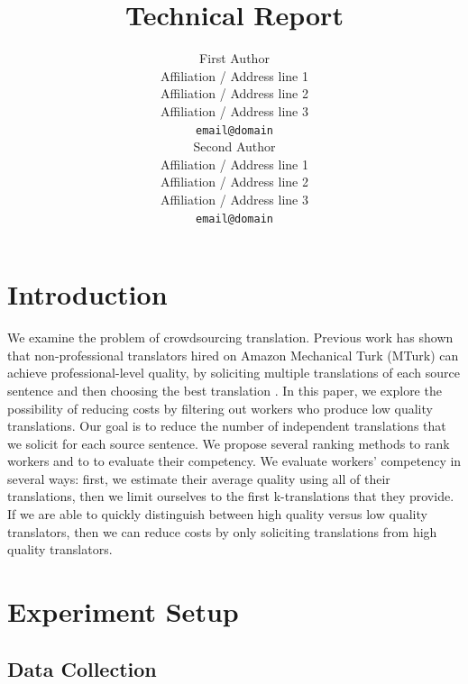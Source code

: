 \documentclass[11pt]{article}
\title{Technical Report}
\author{First Author \\
  Affiliation / Address line 1 \\
  Affiliation / Address line 2 \\
  Affiliation / Address line 3 \\
  {\tt email@domain} \\\And
  Second Author \\
  Affiliation / Address line 1 \\
  Affiliation / Address line 2 \\
  Affiliation / Address line 3 \\
  {\tt email@domain} \\}
\date{}
\begin{document}
\maketitle
\begin{abstract}
\end{abstract}

\section{Introduction}

We examine the problem of crowdsourcing translation. Previous work has shown that non-professional translators hired on Amazon Mechanical Turk (MTurk) can achieve professional-level quality, by soliciting multiple translations of each source sentence and then choosing the best translation \cite{zaidan-callisonburch:2011:ACL-HLT2011a}.
In this paper, we explore the possibility of  reducing costs by filtering out workers who produce low quality translations.  Our goal is to reduce the number of independent translations that we solicit for each source sentence. 
We propose several ranking methods to rank workers and to to evaluate their competency. 
We evaluate workers' competency in several ways: first, we estimate their average quality using all of their translations, then we limit ourselves to the first k-translations that they provide. If we are able to quickly distinguish between high quality versus low quality translators, then we can reduce costs by only soliciting translations from high quality translators.   



\section{Experiment Setup}



\subsection{Data Collection}
\end{document}
